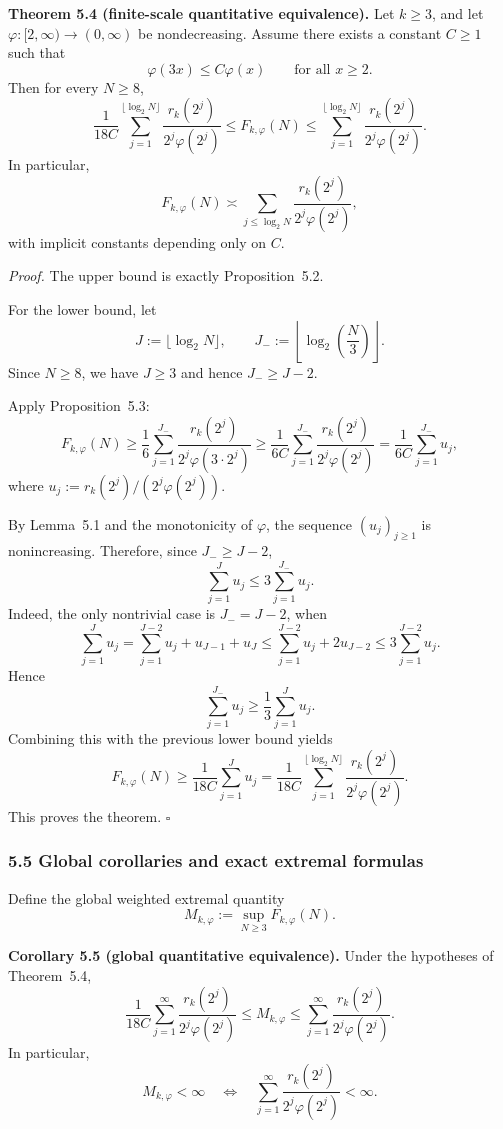 \noindent\textbf{Theorem 5.4 (finite-scale quantitative equivalence).}
Let $k\ge 3$, and let $\varphi:[2,\infty)\to(0,\infty)$ be nondecreasing. Assume there exists a constant $C\ge 1$ such that
\[
\varphi(3x)\le C\varphi(x)\qquad\text{for all }x\ge 2.
\]
Then for every $N\ge 8$,
\[
\frac{1}{18C}
\sum_{j=1}^{\lfloor \log_2 N\rfloor}
\frac{r_k(2^j)}{2^j\varphi(2^j)}
\le
F_{k,\varphi}(N)
\le
\sum_{j=1}^{\lfloor \log_2 N\rfloor}
\frac{r_k(2^j)}{2^j\varphi(2^j)}.
\]
In particular,
\[
F_{k,\varphi}(N)
\asymp
\sum_{j\le \log_2 N}
\frac{r_k(2^j)}{2^j\varphi(2^j)},
\]
with implicit constants depending only on $C$.

\noindent\emph{Proof.}
The upper bound is exactly Proposition~5.2.

For the lower bound, let
\[
J:=\lfloor \log_2 N\rfloor,
\qquad
J_-:=\left\lfloor \log_2\left(\frac{N}{3}\right)\right\rfloor.
\]
Since $N\ge 8$, we have $J\ge 3$ and hence $J_-\ge J-2$.

Apply Proposition~5.3:
\[
F_{k,\varphi}(N)
\ge
\frac16\sum_{j=1}^{J_-}\frac{r_k(2^j)}{2^j\varphi(3\cdot 2^j)}
\ge
\frac{1}{6C}\sum_{j=1}^{J_-}\frac{r_k(2^j)}{2^j\varphi(2^j)}
=
\frac{1}{6C}\sum_{j=1}^{J_-}u_j,
\]
where $u_j:=r_k(2^j)/(2^j\varphi(2^j))$.

By Lemma~5.1 and the monotonicity of $\varphi$, the sequence $(u_j)_{j\ge 1}$ is nonincreasing. Therefore, since $J_-\ge J-2$,
\[
\sum_{j=1}^{J}u_j
\le
3\sum_{j=1}^{J_-}u_j.
\]
Indeed, the only nontrivial case is $J_-=J-2$, when
\[
\sum_{j=1}^{J}u_j
=
\sum_{j=1}^{J-2}u_j + u_{J-1}+u_J
\le
\sum_{j=1}^{J-2}u_j + 2u_{J-2}
\le
3\sum_{j=1}^{J-2}u_j.
\]
Hence
\[
\sum_{j=1}^{J_-}u_j\ge \frac13\sum_{j=1}^{J}u_j.
\]
Combining this with the previous lower bound yields
\[
F_{k,\varphi}(N)
\ge
\frac{1}{18C}\sum_{j=1}^{J}u_j
=
\frac{1}{18C}
\sum_{j=1}^{\lfloor \log_2 N\rfloor}
\frac{r_k(2^j)}{2^j\varphi(2^j)}.
\]
This proves the theorem.
\hfill$\square$

\subsubsection{5.5 Global corollaries and exact extremal formulas}

Define the global weighted extremal quantity
\[
M_{k,\varphi}:=\sup_{N\ge 3} F_{k,\varphi}(N).
\]

\noindent\textbf{Corollary 5.5 (global quantitative equivalence).}
Under the hypotheses of Theorem~5.4,
\[
\frac{1}{18C}
\sum_{j=1}^{\infty}
\frac{r_k(2^j)}{2^j\varphi(2^j)}
\le
M_{k,\varphi}
\le
\sum_{j=1}^{\infty}
\frac{r_k(2^j)}{2^j\varphi(2^j)}.
\]
In particular,
\[
M_{k,\varphi}<\infty
\quad\Longleftrightarrow\quad
\sum_{j=1}^{\infty}
\frac{r_k(2^j)}{2^j\varphi(2^j)}<\infty.
\]

